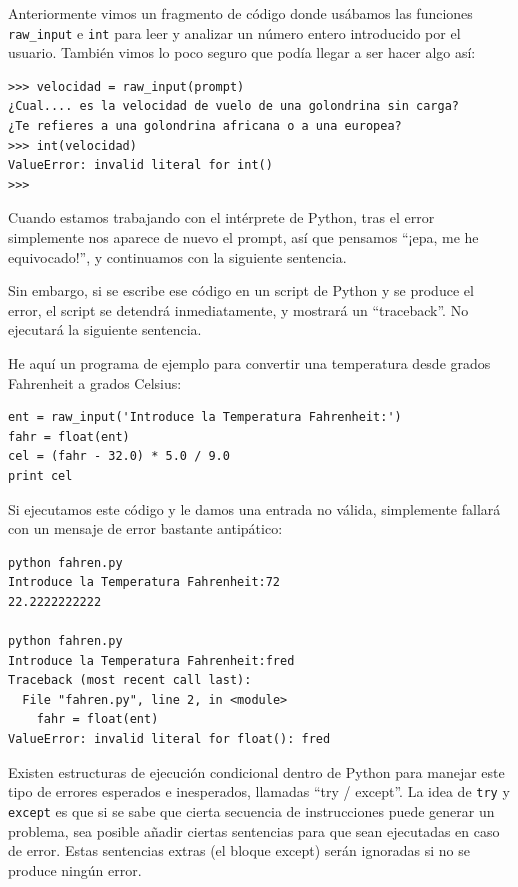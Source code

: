 Anteriormente vimos un fragmento de código donde usábamos las funciones \verb"raw_input" e
{\tt int} para leer y analizar un número entero introducido por
el usuario. También vimos lo poco seguro que podía llegar a ser hacer algo así:

\beforeverb
\begin{verbatim}
>>> velocidad = raw_input(prompt)
¿Cual.... es la velocidad de vuelo de una golondrina sin carga?
¿Te refieres a una golondrina africana o a una europea?
>>> int(velocidad)
ValueError: invalid literal for int()
>>>
\end{verbatim}
\afterverb
%
Cuando estamos trabajando con el intérprete de Python, tras el error simplemente
nos aparece de nuevo el prompt, así que pensamos ``¡epa, me he equivocado!'', y continuamos
con la siguiente sentencia.

Sin embargo, si se escribe ese código en un
script de Python y se produce el error, el script se detendrá
inmediatamente, y mostrará un ``traceback''.
No ejecutará la siguiente sentencia.


He aquí un programa de ejemplo para convertir una temperatura
desde grados Fahrenheit a grados Celsius:


\beforeverb
\begin{verbatim}
ent = raw_input('Introduce la Temperatura Fahrenheit:')
fahr = float(ent)
cel = (fahr - 32.0) * 5.0 / 9.0
print cel
\end{verbatim}
\afterverb
%
Si ejecutamos este código y le damos una entrada no válida, simplemente
fallará con un mensaje de error bastante antipático:

\beforeverb
\begin{verbatim}
python fahren.py 
Introduce la Temperatura Fahrenheit:72
22.2222222222

python fahren.py 
Introduce la Temperatura Fahrenheit:fred
Traceback (most recent call last):
  File "fahren.py", line 2, in <module>
    fahr = float(ent)
ValueError: invalid literal for float(): fred
\end{verbatim}
\afterverb
%
Existen estructuras de ejecución condicional dentro de
Python para manejar este tipo de errores esperados e
inesperados, llamadas ``try / except''. La idea de {\tt try}
y {\tt except} es que si se sabe que cierta secuencia
de instrucciones puede generar un problema, sea posible
añadir ciertas sentencias para que sean ejecutadas en caso de error.
Estas sentencias extras (el bloque except) serán ignoradas
si no se produce ningún error.

